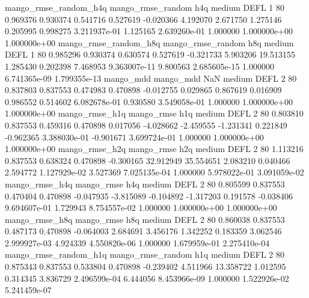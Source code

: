 mango_rmse_random_h4q mango_rmse_random                  h4q     medium     DEFL                 1 80  0.969376       0.930374 0.541716       0.527619   -0.020366      4.192070      2.671750     1.275146       0.205995  0.998275 3.211937e-01     1.125165   2.639260e-01            1.000000    1.000000e+00        1.000000e+00
mango_rmse_random_h8q mango_rmse_random                  h8q     medium     DEFL                 1 80  0.985296       0.930374 0.630574       0.527619   -0.321733      5.903206     19.513155     1.285430       0.202398  7.468953 9.363007e-11     9.800563   2.685605e-15            1.000000    6.741365e-09        1.799355e-13
            mango_mdd         mango_mdd                  NaN     medium     DEFL                 2 80  0.837803       0.837553 0.474983       0.470898   -0.012755      0.029865      0.867619     0.016909       0.986552  0.514602 6.082678e-01     0.930580   3.549058e-01            1.000000    1.000000e+00        1.000000e+00
       mango_rmse_h1q        mango_rmse                  h1q     medium     DEFL                 2 80  0.803810       0.837553 0.459316       0.470898    0.017056     -4.028662     -2.459555    -1.231341       0.221849 -0.962365 3.388030e-01    -0.901671   3.699724e-01            1.000000    1.000000e+00        1.000000e+00
       mango_rmse_h2q        mango_rmse                  h2q     medium     DEFL                 2 80  1.113216       0.837553 0.638324       0.470898   -0.300165     32.912949     35.554651     2.083210       0.040466  2.594772 1.127929e-02     3.527369   7.025135e-04            1.000000    5.978022e-01        3.091059e-02
       mango_rmse_h4q        mango_rmse                  h4q     medium     DEFL                 2 80  0.805599       0.837553 0.470404       0.470898   -0.047935     -3.815089     -0.104892    -1.317203       0.191578 -0.038406 9.694607e-01     1.729943   8.754557e-02            1.000000    1.000000e+00        1.000000e+00
       mango_rmse_h8q        mango_rmse                  h8q     medium     DEFL                 2 80  0.860038       0.837553 0.487173       0.470898   -0.064003      2.684691      3.456176     1.342252       0.183359  3.062546 2.999927e-03     4.924339   4.550820e-06            1.000000    1.679959e-01        2.275410e-04
mango_rmse_random_h1q mango_rmse_random                  h1q     medium     DEFL                 2 80  0.875343       0.837553 0.533804       0.470898   -0.239402      4.511966     13.358722     1.012595       0.314345  3.836729 2.496599e-04     6.444056   8.453966e-09            1.000000    1.522926e-02        5.241459e-07
